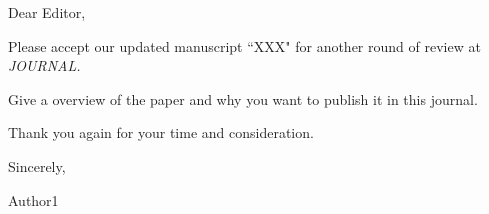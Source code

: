 \documentclass[12pt, letterpaper]{article}
\begin{document}
Dear Editor,

Please accept our updated manuscript ``XXX" for another round of review at \textit{JOURNAL.}

Give a overview of the paper and why you want to publish it in this journal.

Thank you again for your time and consideration.

Sincerely,

Author1
\end{document}
